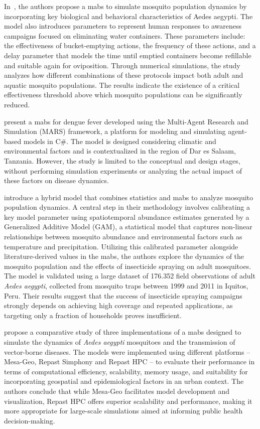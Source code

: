In~\cite{Gramajo2022}, the authors propose a \gls{mabs} to simulate mosquito
population dynamics by incorporating key biological and behavioral
characteristics of Aedes aegypti. The model also introduces parameters to
represent human responses to awareness campaigns focused on eliminating water
containers. These parameters include: the effectiveness of bucket-emptying
actions, the frequency of these actions, and a delay parameter that models the
time until emptied containers become refillable and suitable again for
oviposition. Through numerical simulations, the study analyzes how different
combinations of these protocols impact both adult and aquatic mosquito
populations. The results indicate the existence of a critical effectiveness
threshold above which mosquito populations can be significantly reduced.

\cite{Pascoe2023} present a \gls{mabs} for dengue fever developed using the
Multi-Agent Research and Simulation (MARS) framework, a platform for modeling
and simulating agent-based models in C\#. The model is designed considering
climatic and environmental factors and is contextualized in the region of Dar es
Salaam, Tanzania. However, the study is limited to the conceptual and design
stages, without performing simulation experiments or analyzing the actual impact
of these factors on disease dynamics.

\cite{Cavany2023} introduce a hybrid model that combines statistics and
\gls{mabs} to analyze mosquito population dynamics. A central step in their
methodology involves calibrating a key model parameter using spatiotemporal
abundance estimates generated by a Generalized Additive Model (GAM), a
statistical model that captures non-linear relationships between mosquito
abundance and environmental factors such as temperature and precipitation.
Utilizing this calibrated parameter alongside literature-derived values in the
\gls{mabs}, the authors explore the dynamics of the mosquito population and the
effects of insecticide spraying on adult mosquitoes. The model is validated
using a large dataset of 176.352 field observations of adult \textit{Aedes
	aegypti}, collected from mosquito traps between 1999 and 2011 in Iquitos, Peru.
Their results suggest that the success of insecticide spraying campaigns
strongly depends on achieving high coverage and repeated applications, as
targeting only a fraction of households proves insufficient.


\cite{Uribe2023} propose a comparative study of three implementations of a
\gls{mabs} designed to simulate the dynamics of \textit{Aedes aegypti}
mosquitoes and the transmission of vector-borne diseases. The models were
implemented using different platforms -- Mesa-Geo, Repast Simphony and Repast
HPC -- to evaluate their performance in terms of computational efficiency,
scalability, memory usage, and suitability for incorporating geospatial and
epidemiological factors in an urban context. The authors conclude that while
Mesa-Geo facilitates model development and visualization, Repast HPC offers
superior scalability and performance, making it more appropriate for large-scale
simulations aimed at informing public health decision-making.

